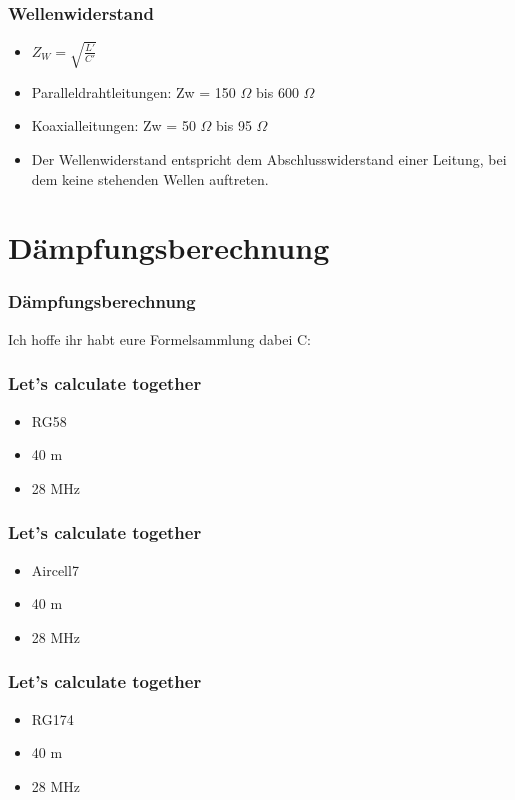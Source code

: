 \begin{frame}
\frametitle{Wellenwiderstand}
\begin{itemize}
	\item \Huge{ $Z_W = \sqrt{\frac{L'}{C'}}$}
	 \normalsize \item Paralleldrahtleitungen: Zw = 150 $\Omega$ bis 600 $\Omega$
	\item Koaxialleitungen: Zw =  50 $\Omega$ bis 95 $\Omega$
	\item Der Wellenwiderstand entspricht dem Abschlusswiderstand einer Leitung, bei dem keine stehenden Wellen auftreten.
\end{itemize}
\end{frame}

\section*{D\"ampfungsberechnung}
\begin{frame}
\frametitle{D\"ampfungsberechnung}
\begin{Large}
Ich hoffe ihr habt eure Formelsammlung dabei C:
\end{Large}
\end{frame}

\begin{frame}
\frametitle{Let's calculate together}
 \begin{itemize}
 	\item RG58\\
 	\item 40 m\\
 	\item 28 MHz
 \end{itemize}
\end{frame}

\begin{frame}
\frametitle{Let's calculate together}
 \begin{itemize}
 	\item Aircell7\\
 	\item 40 m\\
 	\item 28 MHz
 \end{itemize}
\end{frame}

\begin{frame}
\frametitle{Let's calculate together}
 \begin{itemize}
 	\item RG174\\
 	\item 40 m\\
 	\item 28 MHz
 \end{itemize}
\end{frame}


